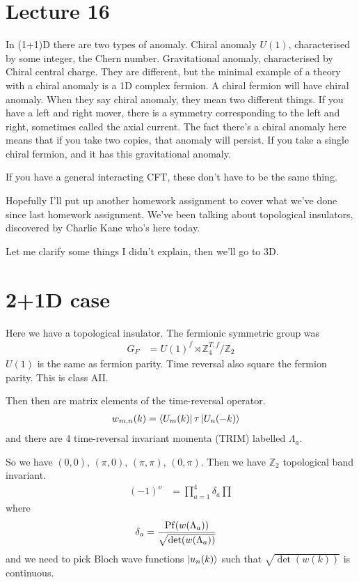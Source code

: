 \section{Lecture 16}
In (1+1)D there are two types of anomaly.
Chiral anomaly $U(1)$, characterised by some integer, the Chern number.
Gravitational anomaly, characterised by Chiral central charge.
They are different,
but the minimal example of a theory with a chiral anomaly is a 1D complex
fermion.
A chiral fermion will have chiral anomaly.
When they say chiral anomaly,
they mean two different things.
If you have a left and right mover,
there is a symmetry corresponding to the left and right,
sometimes called the axial current.
The fact there's a chiral anomaly here
means that if you take two copies,
that anomaly will persist.
If you take a single chiral fermion,
and it has this gravitational anomaly.

If you have a general interacting CFT,
these don't have to be the same thing.

Hopefully I'll put up another homework assignment to cover what we've done since
last homework assignment.
We've been talking about topological insulators,
discovered by Charlie Kane who's here today.

Let me clarify some things I didn't explain,
then we'll go to 3D.

\section{2+1D case}
Here we have a topological insulator.
The fermionic symmetric group was
\begin{align}
    G_F &= U(1)^f \rtimes \mathbb{Z}_4^{T,f} / \mathbb{Z}_2
\end{align}
$U(1)$ is the same as fermion parity.
Time reversal also square the fermion parity.
This is class AII.

Then then are matrix elements of the time-reversal operator.
\begin{align}
    w_{m,n}(k) &=
    \bra{U_m(k)} \tau \ket{U_n(-k)}
\end{align}
and there are 4 time-reversal invariant momenta (TRIM) labelled $\Lambda_a$.

So we have $(0,0)$, $(\pi ,0)$, $(\pi, \pi)$, $(0, \pi)$.
Then we have $\mathbb{Z}_2$ topological band invariant.
\begin{align}
    \left( -1 \right)^{\nu} &= \prod_{a=1}^{4} \delta_a
    \prod
\end{align}
where
\begin{align}
    \delta_a &=
    \frac{\operatorname{Pf}(w(\Lambda_a))}{\sqrt{\det(w(\Lambda_a))}}
\end{align}
and we need to pick Bloch wave functions $\ket{u_n(k)}$ such that
$\sqrt{\det(w(k))}$ is continuous.

